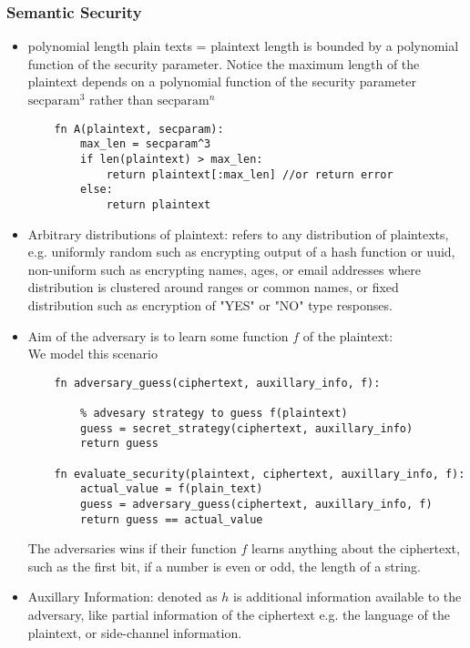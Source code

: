 \subsubsection*{Semantic Security}
\begin{itemize}
    \item polynomial length plain texts = plaintext length is bounded by a polynomial function of the security parameter. Notice the maximum length of the plaintext depends on a polynomial function of the security parameter $\text{secparam}^3$ rather than $\text{secparam}^n$ \\
    \lstset{language=Python, basicstyle=\ttfamily, frame=single}
    \begin{lstlisting}
    fn A(plaintext, secparam):
        max_len = secparam^3
        if len(plaintext) > max_len:
            return plaintext[:max_len] //or return error
        else:
            return plaintext
    \end{lstlisting}
    \item Arbitrary distributions of plaintext: refers to any distribution of plaintexts, e.g. uniformly random such as encrypting output of a hash function or uuid, non-uniform such as encrypting names, ages, or email addresses where distribution is clustered around ranges or common names, or fixed distribution such as encryption of "YES" or "NO" type responses.
    \item Aim of the adversary is to learn some function $f$ of the plaintext: \\
    We model this scenario 
    \lstset{language=Python, basicstyle=\ttfamily, frame=single}
    \begin{lstlisting}
    fn adversary_guess(ciphertext, auxillary_info, f):
        
        % advesary strategy to guess f(plaintext)
        guess = secret_strategy(ciphertext, auxillary_info)
        return guess
    
    fn evaluate_security(plaintext, ciphertext, auxillary_info, f):
        actual_value = f(plain_text)
        guess = adversary_guess(ciphertext, auxillary_info, f)
        return guess == actual_value
    \end{lstlisting}
    The adversaries wins if their function $f$ learns anything about the ciphertext, such as the first bit, if a number is even or odd, the length of a string.
    \item Auxillary Information: denoted as $h$ is additional information available to the adversary, like partial information of the ciphertext e.g. the language of the plaintext, or side-channel information.
\end{itemize}
